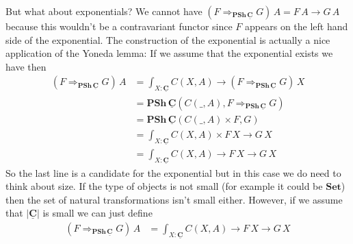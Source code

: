 \documentclass{article}
\newcommand{\Set}{\mathbf{Set}}
\newcommand{\cat}[1]{\underline{\mathbf{#1}}}
\newcommand{\obj}[1]{|#1|}
\newcommand{\PSh}{\mathbf{PSh}}
\newcommand{\expC}[3]{#2\Rightarrow_{#1} #3}
\newtheorem{exercise}{Exercise}
\begin{document}
But what about exponentials? We cannot have $(\expC{\PSh\,\cat{C}}{F}{G})\,A = F\,A \to G\,A$ because this wouldn't be a contravariant functor since $F$ appears on the left hand side of the exponential. The construction of the exponential is actually a nice application of the Yoneda lemma: 
If we assume that the exponential exists we have then 
\begin{align*}
(\expC{\PSh\,\cat{C}}{F}{G})\,A 
& = \int_{X:\cat{C}}C(X,A) \to (\expC{\PSh\,\cat{C}}{F}{G})\,X \\
& = \PSh\,\cat{C}(C(\_,A),\expC{\PSh\,\cat{C}}{F}{G}) \\
& = \PSh\,\cat{C}(C(\_,A) \times F,G) \\
& = \int_{X:\cat{C}}C(X,A)\times F\,X \to G\,X\\
& = \int_{X:\cat{C}}C(X,A)\to F\,X \to G\,X
\end{align*}
So the last line is a candidate for the exponential but in this case we do need to think about size. If the type of objects is not small (for example it could be $\Set$) then the set of natural transformations isn't small either. However, if we assume that $\obj{\cat{C}}$ is small we can just define
\begin{align*}
(\expC{\PSh\,\cat{C}}{F}{G})\,A & = \int_{X:\cat{C}}C(X,A)\to F\,X \to G\,X
\end{align*}
\end{document}
